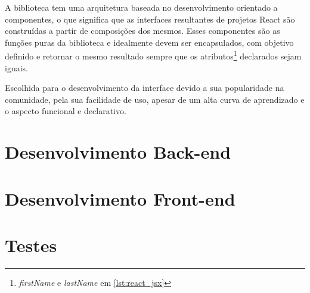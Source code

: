 A biblioteca tem uma arquitetura baseada no desenvolvimento orientado a componentes, o que significa que as interfaces resultantes de projetos React são construídas a partir de composições dos mesmos. Esses componentes são as funções puras da biblioteca e idealmente devem ser encapsulados, com objetivo definido e retornar o mesmo resultado sempre que os atributos\footnote{\textit{firstName} e \textit{lastName} em \ref{lst:react_jsx}} declarados sejam iguais.

Escolhida para o desenvolvimento da interface devido a sua popularidade na comunidade, pela sua facilidade de uso, apesar de um alta curva de aprendizado e o aspecto funcional e declarativo.

\section{Desenvolvimento Back-end}

\section{Desenvolvimento Front-end}

\section{Testes}